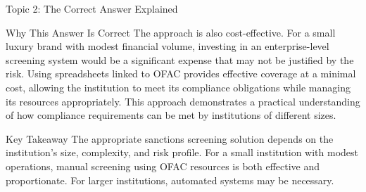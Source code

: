 \documentclass[8pt]{beamer}  %
\begin{document}
\begin{frame}{Topic 2: The Correct Answer Explained}
\begin{block}{\large Why This Answer Is Correct}
			The approach is also cost-effective. For a small luxury brand with modest financial volume, investing in an enterprise-level screening system would be a significant expense that may not be justified by the risk. Using spreadsheets linked to OFAC provides effective coverage at a minimal cost, allowing the institution to meet its compliance obligations while managing its resources appropriately. This approach demonstrates a practical understanding of how compliance requirements can be met by institutions of different sizes.
		\end{block}
		
		\begin{alertblock}{Key Takeaway}
			The appropriate sanctions screening solution depends on the institution's size, complexity, and risk profile. For a small institution with modest operations, manual screening using OFAC resources is both effective and proportionate. For larger institutions, automated systems may be necessary.
		\end{alertblock}
	\end{frame}
	
\end{document}
